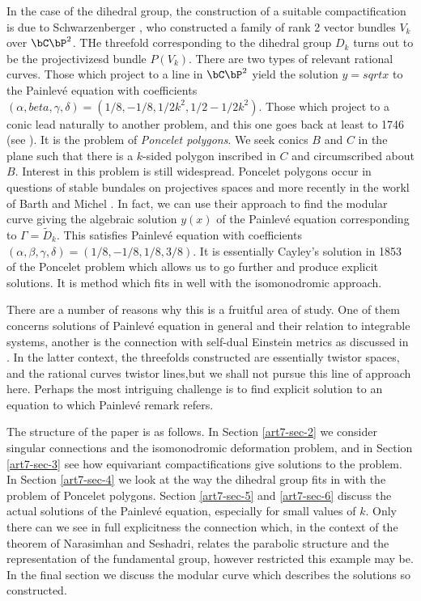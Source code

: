 In the case of the dihedral group, the construction of a suitable compactification is due to Schwarzenberger \cite{art7-key16}, who constructed a family of rank 2 vector bundles $V_{k}$ over $\bC\bP^{2}$. THe threefold corresponding to the dihedral group $D_{k}$ turns out to be the projectivizesd bundle $P(V_{k})$. There are two types of relevant rational curves. Those which project to a line in $\bC\bP^{2}$ yield the solution $y =sqrt{x}$ to the Painlev\'e equation with coefficients $(\alpha, beta, \gamma, \delta) = (1/8, -1/8, 1/2k^{2}, 1/2-1/2k^{2})$. Those which project to a conic lead naturally to another problem, and this one goes back at least to 1746 (see \cite{art7-key3}). It is the problem of \textit{Poncelet polygons}. We seek conics $B$ and $C$ in the plane such that there is a $k$-sided polygon inscribed in  $C$ and circumscribed about $B$. Interest in this problem is still widespread. Poncelet polygons occur in questions of stable bundales on projectives spaces\cite{art7-key14} and more recently in the workl of Barth and Michel \cite{art7-key1}. In fact, we can use their approach to find the modular curve giving the algebraic solution $y(x)$ of the Painlev\'e equation corresponding to $\Gamma = \tilde{D}_{k}$. This satisfies Painlev\'e equation with coefficients $(\alpha, \beta, \gamma, \delta) = (1/8, -1/8, 1/8, 3/8)$. It is essentially Cayley's solution in 1853 of the Poncelet problem which allows us to go further and produce explicit solutions. It is method which fits in well with the isomonodromic approach. 

There are a number of reasons why this is a fruitful area of study. One of them concerns solutions of Painlev\'e equation in general and their relation to integrable systems, another is the connection with self-dual Einstein metrics as discussed in \cite{art7-key6}. In the latter context, the threefolds constructed are essentially twistor spaces, and the rational curves twistor lines,but we shall not pursue this line of approach here. Perhaps the most intriguing challenge is to find  explicit solution to an equation to which Painlev\'e remark refers.

The structure of the paper is as follows. In Section \ref{art7-sec-2} we consider singular connections and the isomonodromic deformation problem, and in Section \ref{art7-sec-3} see how equivariant compactifications give solutions to the problem. In Section \ref{art7-sec-4} we look at the way the dihedral group fits in with the problem of Poncelet polygons. Section \ref{art7-sec-5} and \ref{art7-sec-6} discuss the actual solutions of the Painlev\'e equation, especially for small values of $k$. Only there can we see in full explicitness the connection which, in the context of the theorem of Narasimhan and Seshadri, relates the parabolic structure and the representation of the fundamental group, however restricted this example may be. In the final section we discuss the modular curve which describes the solutions so constructed.

